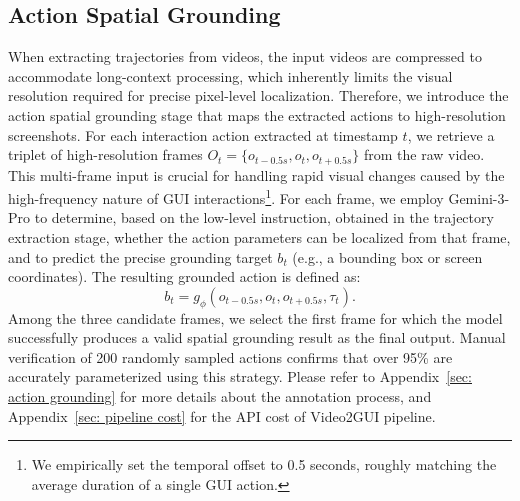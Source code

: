 \documentclass{llmxive}
\begin{document}

\subsection{Action Spatial Grounding}
\label{subsec: spatial grounding}
When extracting trajectories from videos, the input videos are compressed to accommodate long-context processing, which inherently limits the visual resolution required for precise pixel-level localization. Therefore, we introduce the action spatial grounding stage that maps the extracted actions to high-resolution screenshots.
For each interaction action extracted at timestamp $t$, we retrieve a triplet of high-resolution frames $O_t = \{o_{t-0.5s}, o_t, o_{t+0.5s}\}$ from the raw video. This multi-frame input is crucial for handling rapid visual changes caused by the high-frequency nature of GUI interactions\footnote{We empirically set the temporal offset to 0.5 seconds, roughly matching the average duration of a single GUI action.}. For each frame, we employ Gemini-3-Pro to determine, based on the low-level instruction, obtained in the trajectory extraction stage, whether the action parameters can be localized from that frame, and to predict the precise grounding target $b_t$ (e.g., a bounding box or screen coordinates). The resulting grounded action is defined as: 
\begin{equation}
b_t = g_\phi(o_{t-0.5s}, o_t, o_{t+0.5s}, \tau_t).
\end{equation}
Among the three candidate frames, we select the first frame for which the model successfully produces a valid spatial grounding result as the final output. 
Manual verification of 200 randomly sampled actions confirms that over 95\% are accurately parameterized using this strategy.
Please refer to Appendix~\ref{sec: action grounding} for more details about the annotation process, and Appendix~\ref{sec: pipeline cost} for the API cost of Video2GUI pipeline.
\end{document}

